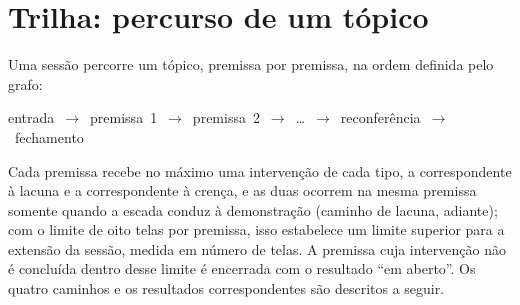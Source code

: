 \section{Trilha: percurso de um tópico}

Uma sessão percorre um tópico, premissa por premissa, na ordem definida pelo grafo:

\begin{center}\small\ttfamily
entrada~$\rightarrow$~premissa~1~$\rightarrow$~premissa~2~$\rightarrow$~…~$\rightarrow$~reconferência~$\rightarrow$~fechamento
\end{center}

Cada premissa recebe no máximo uma intervenção de cada tipo, a correspondente à lacuna e a correspondente à crença, e as duas ocorrem na mesma premissa somente quando a escada conduz à demonstração (caminho de lacuna, adiante); com o limite de oito telas por premissa, isso estabelece um limite superior para a extensão da sessão, medida em número de telas. A premissa cuja intervenção não é concluída dentro desse limite é encerrada com o resultado ``em aberto''. Os quatro caminhos e os resultados correspondentes são descritos a seguir.

